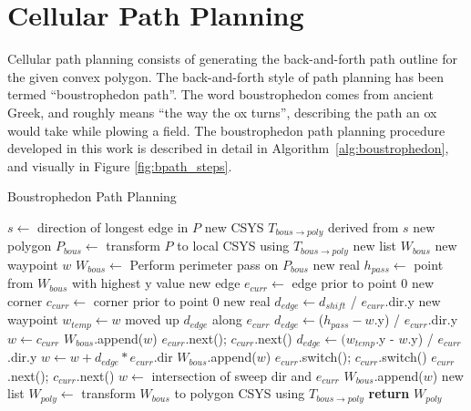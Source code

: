 \section{Cellular Path Planning}
Cellular path planning consists of generating the back-and-forth path outline for the given convex polygon.
The back-and-forth style of path planning has been termed ``boustrophedon path''.
The word boustrophedon comes from ancient Greek, and roughly means ``the way the ox turns'', describing the path an ox would take while plowing a field.
The boustrophedon path planning procedure developed in this work is described in detail in Algorithm~\ref{alg:boustrophedon}, and visually in Figure \ref{fig:bpath_steps}.

\begin{algorithm}[!htbp]
\caption{Boustrophedon Path Planning}\label{alg:boustrophedon}
\begin{algorithmic}[1]
		\State $s \leftarrow$ direction of longest edge in $P$
	\EndIf
	\State new CSYS $T_{bous\rightarrow poly}$ derived from $s$
	\State new polygon $P_{bous} \leftarrow$ transform $P$ to local CSYS using $T_{bous\rightarrow poly}$
	\State new list $W_{bous}$ 
	\State new waypoint $w$
	\State $W_{bous} \leftarrow$ Perform perimeter pass on $P_{bous}$
	\State new real $h_{pass} \leftarrow$ point from $W_{bous}$ with highest y value
	\State new edge $e_{curr} \leftarrow$ edge prior to point 0
	\State new corner $c_{curr} \leftarrow$ corner prior to point 0
		\State new real $d_{edge} \leftarrow d_{shift}$ / $e_{curr}$.dir.y
		\State new waypoint $w_{temp} \leftarrow w$ moved up $d_{edge}$ along $e_{curr}$
			\State $d_{edge} \leftarrow $($h_{pass} - w$.y) / $e_{curr}$.dir.y
			\State $w \leftarrow c_{curr}$
			\State $W_{bous}$.append($w$)
			\State $e_{curr}$.next(); $c_{curr}$.next()
			\State $d_{edge} \leftarrow (w_{temp}$.y - $w$.y) / $e_{curr}$.dir.y
		\EndIf
		\State $w \leftarrow w + d_{edge} * e_{curr}$.dir
		\State $W_{bous}$.append($w$)
		\State $e_{curr}$.switch(); $c_{curr}$.switch()
			\State $e_{curr}$.next(); $c_{curr}$.next()
		\EndIf
		\State $w \leftarrow$ intersection of sweep dir and $e_{curr}$
		\State $W_{bous}$.append($w$)
	\EndWhile
	\State new list $W_{poly} \leftarrow$ transform $W_{bous}$ to polygon CSYS using $T_{bous\rightarrow poly}$
	\State \textbf{return} $W_{poly}$
\EndFunction
\end{algorithmic}
\end{algorithm}

